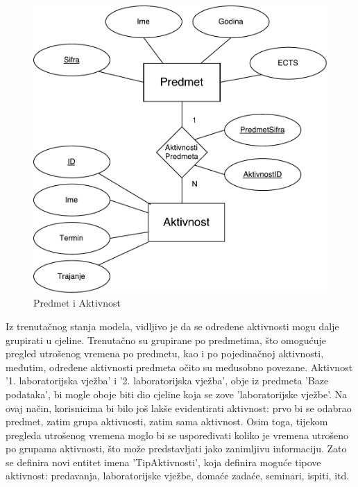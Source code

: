 \documentclass[times, utf8, zavrsni]{fer}
\begin{document}
\begin{figure}[H]
\centering
\includegraphics[width=\textwidth,height=\textheight,keepaspectratio]{img/predmet-aktivnost.pdf}
\caption{Predmet i Aktivnost}
\label{fig:predmet-aktivnost}
\end{figure}

Iz trenutačnog stanja modela, vidljivo je da se određene aktivnosti mogu dalje grupirati u cjeline. Trenutačno su grupirane po predmetima, što omogućuje pregled utrošenog vremena po predmetu, kao i po pojedinačnoj aktivnosti, međutim, određene aktivnosti predmeta očito su međusobno povezane. Aktivnost '1. laboratorijska vježba' i '2. laboratorijska vježba', obje iz predmeta 'Baze podataka', bi mogle oboje biti dio cjeline koja se zove 'laboratorijske vježbe'. Na ovaj način, korisnicima bi bilo još lakše evidentirati aktivnost: prvo bi se odabrao predmet, zatim grupa aktivnosti, zatim sama aktivnost. Osim toga, tijekom pregleda utrošenog vremena moglo bi se uspoređivati koliko je vremena utrošeno po grupama aktivnosti, što može predstavljati jako zanimljivu informaciju. Zato se definira novi entitet imena 'TipAktivnosti', koja definira moguće tipove aktivnost: predavanja, laboratorijske vježbe, domaće zadaće, seminari, ispiti, itd.
\end{document}
